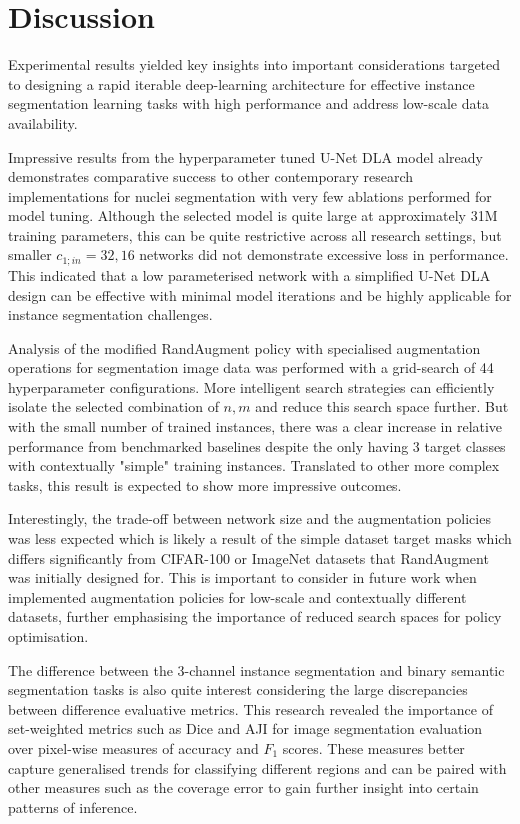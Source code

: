 \section{Discussion}

Experimental results yielded key insights into important considerations targeted to designing a rapid iterable deep-learning architecture for effective instance segmentation learning tasks with high performance and address low-scale data availability.

Impressive results from the hyperparameter tuned U-Net DLA model already demonstrates comparative success to other contemporary research implementations for nuclei segmentation with very few ablations performed for model tuning. Although the selected model is quite large at approximately 31M training parameters, this can be quite restrictive across all research settings, but smaller $c_{1;in}=32,16$ networks did not demonstrate excessive loss in performance. This indicated that a low parameterised network with a simplified U-Net DLA design can be effective with minimal model iterations and be highly applicable for instance segmentation challenges. 

Analysis of the modified RandAugment policy with specialised augmentation operations for segmentation image data was performed with a grid-search of 44 hyperparameter  configurations. More intelligent search strategies can efficiently isolate the selected combination of $n,m$ and reduce this search space further. But with the small number of trained instances, there was a clear increase in relative performance from benchmarked baselines despite the only having 3 target classes with contextually "simple" training instances. Translated to other more complex tasks, this result is expected to show more impressive outcomes.

Interestingly, the trade-off between network size and the augmentation policies was less expected which is likely a result of the simple dataset target masks which differs significantly from CIFAR-100 or ImageNet datasets that RandAugment was initially designed for. This is important to consider in future work when implemented augmentation policies for low-scale and contextually different datasets, further emphasising the importance of reduced search spaces for policy optimisation.

The difference between the 3-channel instance segmentation and binary semantic segmentation tasks is also quite interest considering the large discrepancies between difference evaluative metrics. This research revealed the importance of set-weighted metrics such as Dice and AJI for image segmentation evaluation over pixel-wise measures of accuracy and $F_1$ scores. These measures better capture generalised trends for classifying different regions and can be paired with other measures such as the coverage error to gain further insight into certain patterns of inference.

